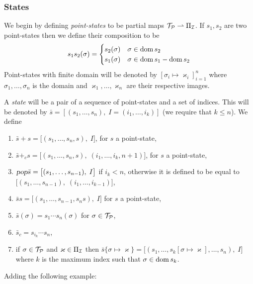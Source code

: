 \documentclass{llncs}
\newcommand{\ari}[1]{{\begin{mdframed}[linecolor=blue]{\color{blue}#1}\end{mdframed}}}
\begin{document}
\subsubsection{States}

We begin by defining \textit{point-states} to be partial maps $\mathcal T_{\mathcal P}\rightharpoonup\Pi_{\mathcal I}$.
If $s_1,s_2$ are two point-states then we define their composition to be
\[ s_1s_2(\sigma) = \begin{cases} s_2(\sigma) & \sigma\in\operatorname{dom} s_2\\ s_1(\sigma) & \sigma\in\operatorname{dom} s_1-\operatorname{dom} s_2\end{cases} \]
Point-states with finite domain will be denoted by $[\sigma_i\mapsto\varkappa_i]_{i=1}^n$ where $\sigma_1,\dots,\sigma_n$ is the domain and $\varkappa_1,\dots,\varkappa_n$ are their respective images.

A \textit{state} will be a pair of a sequence of point-states and a set of indices.
This will be denoted by $\bar s=[(s_1,\dots,s_n),\;I=(i_1,\dots,i_k)]$ (we require that $k\leq n$).
We define
\begin{enumerate}
    \item $\bar s+s=\bigl[(s_1,\dots,s_n,s),\;I\bigr]$, for $s$ a point-state,
    \item $\bar s+_cs=\bigl[(s_1,\dots,s_n,s),\;(i_1,\dots,i_k,n+1)\bigr]$, for $s$ a point-state,
    \item $\textsl{pop}\bar s=\bigl[(s_1,\dots,s_{n-1}),\;I\bigr]$ if $i_k<n$, otherwise it is defined to be equal to $\bigl[(s_1,\dots,s_{n-1}),\;(i_1,\dots,i_{k-1})\bigr]$,
    \item $\bar ss=\bigl[(s_1,\dots,s_{n-1},s_ns),\;I\bigr]$ for $s$ a point-state,
    \item $\bar s(\sigma)=s_1\cdots s_n(\sigma)$ for $\sigma\in\mathcal T_{\mathcal P}$,
    \item $\bar s_c=s_{i_k}\cdots s_n$,
    \item if $\sigma\in\mathcal T_{\mathcal P}$ and $\varkappa\in\Pi_{\mathcal I}$ then $\bar s\{\sigma\mapsto\varkappa\}=\bigl[(s_1,\dots,s_k[\sigma\mapsto\varkappa],\dots,s_n),\;I\bigr]$ where $k$ is the maximum index such that
    $\sigma\in\operatorname{dom} s_k$.
\end{enumerate}

\ari{Adding the following example:}
\end{document}
